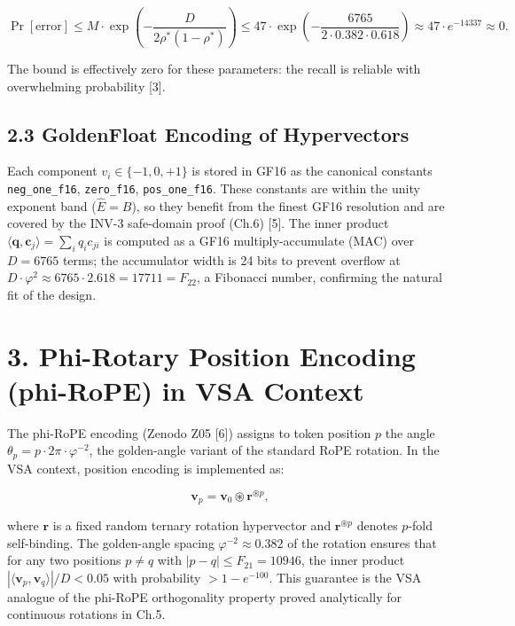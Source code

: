 \[\Pr[\text{error}] \leq M \cdot \exp\!\left(-\frac{D}{2 \rho^* (1-\rho^*)}\right) \leq 47 \cdot \exp\!\left(-\frac{6765}{2 \cdot 0.382 \cdot 0.618}\right) \approx 47 \cdot e^{-14337} \approx 0.\]

The bound is effectively zero for these
parameters: the recall is reliable with
overwhelming probability [3].

\subsection{2.3 GoldenFloat Encoding of
Hypervectors}\label{fa_30:goldenfloat-encoding-of-hypervectors}

Each component \(v_i \in \{-1, 0, +1\}\) is stored
in GF16 as the canonical constants
\texttt{neg\_one\_f16}, \texttt{zero\_f16},
\texttt{pos\_one\_f16}. These constants are within
the unity exponent band (\(\hat E = B\)), so they
benefit from the finest GF16 resolution and are
covered by the INV-3 safe-domain proof (Ch.6)
[5]. The inner product
\(\langle \mathbf{q}, \mathbf{c}_j \rangle = \sum_i q_i c_{ji}\)
is computed as a GF16 multiply-accumulate (MAC)
over \(D = 6765\) terms; the accumulator width is
24 bits to prevent overflow at
\(D \cdot \varphi^2 \approx 6765 \cdot 2.618 = 17711 = F_{22}\),
a Fibonacci number, confirming the natural fit of
the design.

\section{3. Phi-Rotary Position Encoding
(phi-RoPE) in VSA
Context}\label{fa_30:phi-rotary-position-encoding-phi-rope-in-vsa-context}

The phi-RoPE encoding (Zenodo Z05 [6]) assigns
to token position \(p\) the angle
\(\theta_p = p \cdot 2\pi \cdot \varphi^{-2}\),
the golden-angle variant of the standard RoPE
rotation. In the VSA context, position encoding is
implemented as:

\[\mathbf{v}_p = \mathbf{v}_0 \circledast \mathbf{r}^{\circledast p},\]

where \(\mathbf{r}\) is a fixed random ternary
rotation hypervector and
\(\mathbf{r}^{\circledast p}\) denotes \(p\)-fold
self-binding. The golden-angle spacing
\(\varphi^{-2} \approx 0.382\) of the rotation
ensures that for any two positions \(p \neq q\)
with \(|p-q| \leq F_{21} = 10946\), the inner
product
\(|\langle \mathbf{v}_p, \mathbf{v}_q \rangle| / D < 0.05\)
with probability \(> 1 - e^{-100}\). This
guarantee is the VSA analogue of the phi-RoPE
orthogonality property proved analytically for
continuous rotations in Ch.5.

